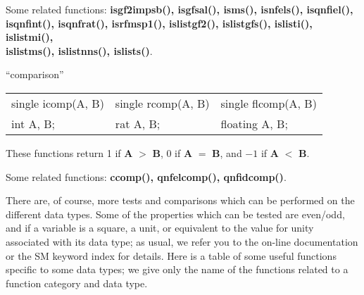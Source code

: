 Some related functions:\hspace*{0.7em}
{\bf isgf2impsb(), isgfsal(), isms(), isnfels(), isqnfiel(), \\
isqnfint(), isqnfrat(),
isrfmsp1(), islistgf2(), islistgfs(), islisti(), islistmi(), \\
islistms(), islistnns(), islists()}.

\begin{center} ``comparison'' \end{center}
\begin{center}
{\bf
\begin{tabular}{lll}
single icomp(A, B) & single rcomp(A, B) & single flcomp(A, B)\\
int A, B;          & rat A, B;          & floating A, B;\\[1.5ex]
\end{tabular} }
\end{center}

These functions return 1 if {\bf A} $>$ {\bf B}, 0 if {\bf A} $=$ {\bf B}, and $-1$ if
{\bf A} $<$ {\bf B}.

Some related functions:\hspace*{0.7em}
{\bf ccomp(), qnfelcomp(), qnfidcomp()}.


\leer\leer

\newpage

There are, of course, more tests and comparisons which can be performed on the
different data types. Some of the properties which can be tested are even/odd,
and if a variable is a square, a unit, or equivalent to the value for unity
associated with its data type; as usual, we refer you to the on-line
documentation or the SM keyword index for details. Here is a table of some 
useful functions specific
to some data types; we give only the name of the functions related to a
function category and data type.

